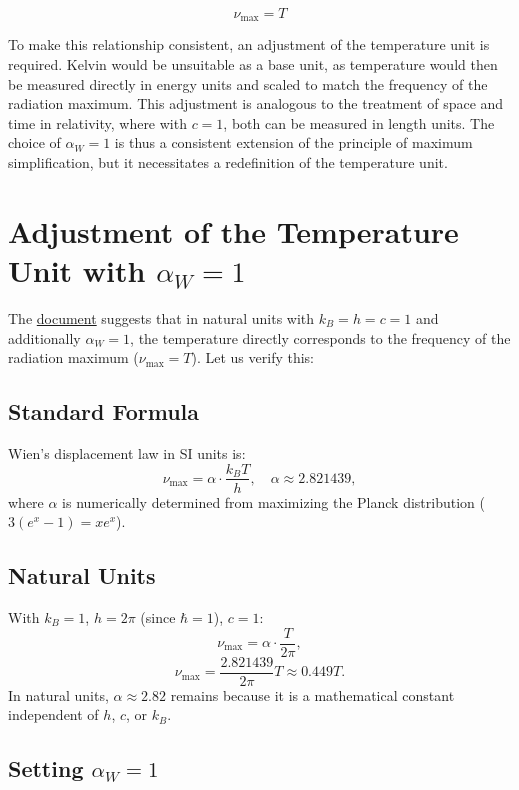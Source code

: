 \documentclass[12pt,a4paper]{article}
\begin{document}
	\begin{equation}
		\nu_{\text{max}} = T
	\end{equation}
	
	To make this relationship consistent, an adjustment of the temperature unit is required. Kelvin would be unsuitable as a base unit, as temperature would then be measured directly in energy units and scaled to match the frequency of the radiation maximum. This adjustment is analogous to the treatment of space and time in relativity, where with $c = 1$, both can be measured in length units. The choice of $\alpha_W = 1$ is thus a consistent extension of the principle of maximum simplification, but it necessitates a redefinition of the temperature unit.
	
	\section{Adjustment of the Temperature Unit with $\alpha_W = 1$}
	
	The \href{https://github.com/jpascher/T0-Time-Mass-Duality/tree/main/2/pdf/English/Natürliche Einheiten mit Feinstrukturkonstante alpha = 1_en.pdf}{document} suggests that in natural units with $k_B = h = c = 1$ and additionally $\alpha_W = 1$, the temperature directly corresponds to the frequency of the radiation maximum ($\nu_{\text{max}} = T$). Let us verify this:
	
	\subsection{Standard Formula}
	
	Wien's displacement law in SI units is:
	\[
	\nu_{\text{max}} = \alpha \cdot \frac{k_B T}{h}, \quad \alpha \approx 2.821439,
	\]
	where $\alpha$ is numerically determined from maximizing the Planck distribution ($3 (e^x - 1) = x e^x$).
	
	\subsection{Natural Units}
	
	With $k_B = 1$, $h = 2\pi$ (since $\hbar = 1$), $c = 1$:
	\[
	\nu_{\text{max}} = \alpha \cdot \frac{T}{2\pi},
	\]
	\[
	\nu_{\text{max}} = \frac{2.821439}{2\pi} T \approx 0.449 T.
	\]
	In natural units, $\alpha \approx 2.82$ remains because it is a mathematical constant independent of $h$, $c$, or $k_B$.
	
	\subsection{Setting $\alpha_W = 1$}
	
\end{document}
